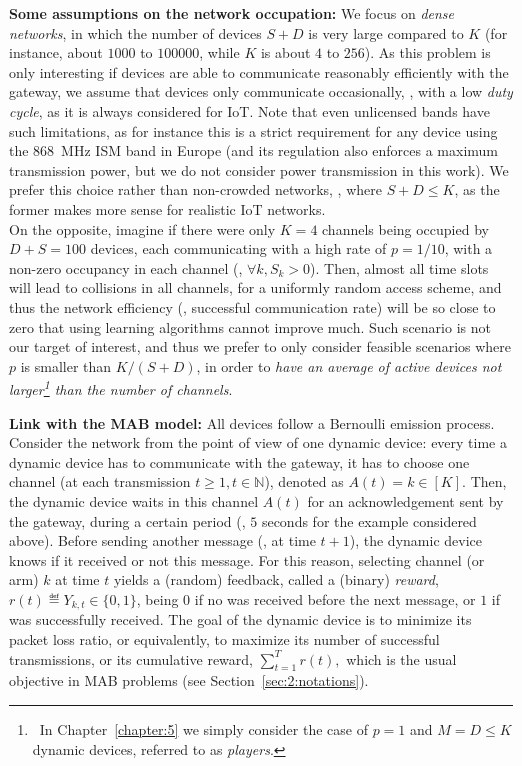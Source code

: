 \textbf{Some assumptions on the network occupation:}
%
We focus on \emph{dense networks}, in which the number of devices $S + D$ is very large compared to $K$ (for instance, about $1000$ to $100000$, while $K$ is about $4$ to $256$).
As this problem is only interesting if devices are able to communicate reasonably efficiently with the gateway, we assume that devices only communicate occasionally, \ie, with a low \emph{duty cycle}, as it is always considered for IoT.
Note that even unlicensed bands have such limitations, as for instance this is a strict requirement for any device using the \SI{868}{\mega\hertz} ISM band in Europe (and its regulation also enforces a maximum transmission power, but we do not consider power transmission in this work).
%
We prefer this choice rather than non-crowded networks, \ie, where $S + D \leq K$, as the former makes more sense for realistic IoT networks.\\
\indent
On the opposite, imagine if there were only $K=4$ channels being occupied by $D+S = 100$ devices, each communicating with a high rate of $p=1/10$, with a non-zero occupancy in each channel (\ie, $\forall k, S_k > 0$). Then, almost all time slots will lead to collisions in all channels, for a uniformly random access scheme, and thus the network efficiency (\ie, successful communication rate) will be so close to zero that using learning algorithms cannot improve much.
Such scenario is not our target of interest, and thus we prefer to only consider feasible scenarios where $p$ is smaller than $K/(S+D)$, in order to \emph{have an average of active devices not larger\footnote{~In Chapter~\ref{chapter:5} we simply consider the case of $p=1$ and $M = D \leq K$ dynamic devices, referred to as \emph{players}.} than the number of channels}.


\textbf{Link with the MAB model:}
%
All devices follow a Bernoulli emission process.
Consider the network from the point of view of one dynamic device:
every time a dynamic device has to communicate with the gateway,
it has to choose one channel (at each transmission $t \geq 1, t \in \mathbb{N}$), denoted as $A(t) = k \in[K]$.
Then, the dynamic device waits in this channel $A(t)$ for an acknowledgement sent by the gateway, during a certain period (\eg, $5$ seconds for the example considered above).
Before sending another message (\ie, at time $t+1$), the dynamic device knows if it received or not this \Ack{} message.
%
For this reason, selecting channel (or arm) $k$ at time $t$ yields a (random) feedback, called a (binary) \emph{reward}, $r(t) \eqdef Y_{k,t} \in \{0,1\}$, being $0$ if no \Ack{} was received before the next message, or $1$ if \Ack{} was successfully received.
The goal of the dynamic device is to minimize its packet loss ratio, or equivalently, to maximize its number of successful transmissions, or its cumulative reward,
$\sum_{t = 1}^T r(t),$
which is the usual objective in MAB problems (see Section~\ref{sec:2:notations}).


